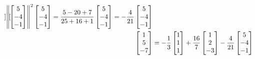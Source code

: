 \begin{solution}
\begin{enumerate}[a)]
\begin{align*}
{\begin{bmatrix}
				\end{bmatrix}
			}{\left\Vert 
				\begin{bmatrix}
					5 \\ -4 \\ -1
				\end{bmatrix}
			 \right\Vert^{2}}
			\begin{bmatrix}
				5 \\ -4 \\ -1
			\end{bmatrix} 
			=\dfrac{5 - 20 + 7}{25 + 16 + 1}
			\begin{bmatrix}
				5 \\ -4 \\ -1
			\end{bmatrix} 
			= -\dfrac{4}{21}
			\begin{bmatrix}
				5 \\ -4 \\ -1
			\end{bmatrix}\\
			\begin{bmatrix}
				1 \\ 5 \\ -7
			\end{bmatrix}
			&=
			-\dfrac{1}{3}
			\begin{bmatrix}
				1 \\ 1 \\ 1
			\end{bmatrix}
			+\dfrac{16}{7}
			\begin{bmatrix}
				1 \\ 2 \\ -3
			\end{bmatrix}
			-\dfrac{4}{21}
			\begin{bmatrix}
				5 \\ -4 \\ -1
			\end{bmatrix}
		\end{align*}
	\end{enumerate}
\end{solution}